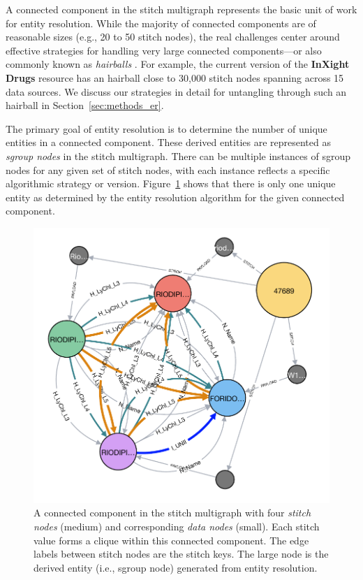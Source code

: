 \documentclass{bioinfo}
\newcommand\ix{\textbf{InXight Drugs}}
\begin{document}
A connected component in the stitch multigraph represents the basic unit of work for entity resolution. While the majority of connected components are of reasonable sizes (e.g., 20 to 50 stitch nodes), the real challenges center around effective strategies for handling very large connected components---or also commonly known as \emph{hairballs} \citep{Croset2015}. For example, the current version of the \ix{} resource has an hairball close to 30,000 stitch nodes spanning across 15 data sources. We discuss our strategies in detail for untangling through such an hairball in Section~\ref{sec:methods_er}.

The primary goal of entity resolution is to determine the number of unique entities in a connected component. These derived entities are represented as \emph{sgroup nodes} in the stitch multigraph. There can be multiple instances of sgroup nodes for any given set of stitch nodes, with each instance reflects a specific algorithmic strategy or version. Figure~\ref{fig:graph1} shows that there is only one unique entity as determined by the entity resolution algorithm for the given connected component.

\begin{figure}[!tpb]
\centerline{\includegraphics[scale=0.5]{graph3}}
\caption{A connected component in the stitch multigraph with four \emph{stitch nodes} (medium) and corresponding \emph{data nodes} (small). Each stitch value forms a clique within this connected component. The edge labels between stitch nodes are the stitch keys. The large node is the derived entity (i.e., sgroup node) generated from entity resolution.}\label{fig:graph1}
\end{figure}
\end{document}
